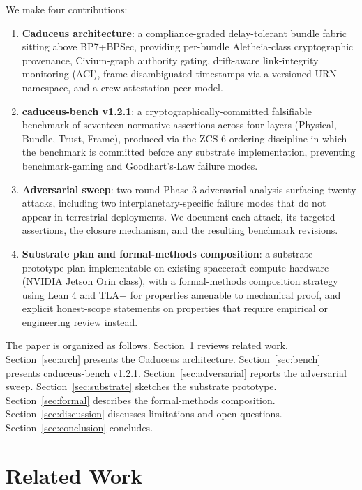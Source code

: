 \documentclass[conference]{IEEEtran}
\begin{document}
We make four contributions:

\begin{enumerate}
    \item \textbf{Caduceus architecture}: a compliance-graded delay-tolerant bundle fabric sitting above BP7+BPSec, providing per-bundle Aletheia-class cryptographic provenance, Civium-graph authority gating, drift-aware link-integrity monitoring (ACI), frame-disambiguated timestamps via a versioned URN namespace, and a crew-attestation peer model.

    \item \textbf{caduceus-bench v1.2.1}: a cryptographically-committed falsifiable benchmark of seventeen normative assertions across four layers (Physical, Bundle, Trust, Frame), produced via the ZCS-6 ordering discipline in which the benchmark is committed before any substrate implementation, preventing benchmark-gaming and Goodhart's-Law failure modes.

    \item \textbf{Adversarial sweep}: two-round Phase 3 adversarial analysis surfacing twenty attacks, including two interplanetary-specific failure modes that do not appear in terrestrial deployments. We document each attack, its targeted assertions, the closure mechanism, and the resulting benchmark revisions.

    \item \textbf{Substrate plan and formal-methods composition}: a substrate prototype plan implementable on existing spacecraft compute hardware (NVIDIA Jetson Orin class), with a formal-methods composition strategy using Lean 4 \cite{moura2021lean} and TLA+ \cite{lamport2002tla} for properties amenable to mechanical proof, and explicit honest-scope statements on properties that require empirical or engineering review instead.
\end{enumerate}

The paper is organized as follows. Section~\ref{sec:related} reviews related work. Section~\ref{sec:arch} presents the Caduceus architecture. Section~\ref{sec:bench} presents caduceus-bench v1.2.1. Section~\ref{sec:adversarial} reports the adversarial sweep. Section~\ref{sec:substrate} sketches the substrate prototype. Section~\ref{sec:formal} describes the formal-methods composition. Section~\ref{sec:discussion} discusses limitations and open questions. Section~\ref{sec:conclusion} concludes.

\section{Related Work}\label{sec:related}
\end{document}
